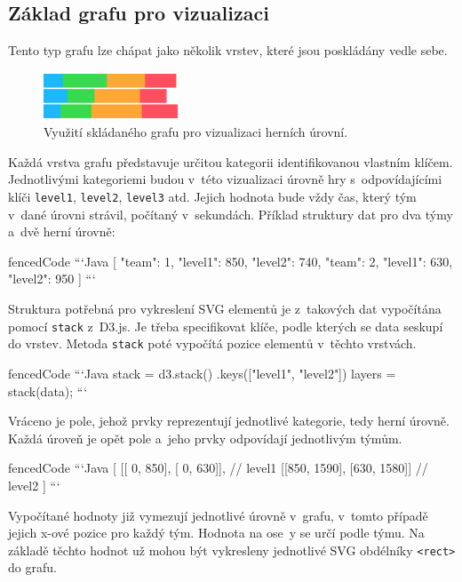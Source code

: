 \documentclass[
  digital, %
  oneside, %
  table,   %
  nolof,     %
  nolot,     %
  nocover
]{fithesis3}
\begin{document}
\subsection{Základ grafu pro vizualizaci} \label{chartBase}
Tento typ grafu lze chápat jako několik vrstev, které jsou poskládány vedle sebe.
\begin{figure}[H]
  \begin{center}
    \includegraphics[width=4cm]{images/stack-ctf.pdf}
  \end{center}
  \caption{Využití skládaného grafu pro vizualizaci herních úrovní.}
  \label{fig:visualizationChart}
\end{figure}
Každá vrstva grafu představuje určitou kategorii identifikovanou vlastním klíčem. Jednotlivými kategoriemi budou v~této vizualizaci úrovně hry s~odpovídajícími klíči \verb|level1|, \verb|level2|, \verb|level3| atd. Jejich hodnota bude vždy čas, který tým v~dané úrovni strávil, počítaný v~sekundách. Příklad struktury dat pro dva týmy a~dvě herní úrovně:
\begin{markdown*}{
  fencedCode
}
```Java
[
  {"team": 1, "level1": 850, "level2": 740},
  {"team": 2, "level1": 630, "level2": 950}
]
```
\end{markdown*}

Struktura potřebná pro vykreslení SVG elementů je z~takových dat vypočítána pomocí \verb|stack| z~D3.js. Je třeba specifikovat klíče, podle kterých se data seskupí do vrstev. Metoda \verb|stack| poté vypočítá pozice elementů v~těchto vrstvách.

\begin{markdown*}{
  fencedCode
}
```Java
stack = d3.stack()
		  .keys(["level1", "level2"])
layers = stack(data);
```
\end{markdown*}
Vráceno je pole, jehož prvky reprezentují jednotlivé kategorie, tedy herní úrovně. Každá úroveň je opět pole a~jeho prvky odpovídají jednotlivým týmům.
\begin{markdown*}{
  fencedCode
}
```Java
[
  [[  0, 850], [  0, 630]],     // level1
  [[850, 1590], [630, 1580]]    // level2
]
```
\end{markdown*}
Vypočítané hodnoty již vymezují jednotlivé úrovně v~grafu, v~tomto případě jejich \mbox{x-ové} pozice pro každý tým. Hodnota na ose~y se určí podle týmu. Na základě těchto hodnot už mohou být vykresleny jednotlivé SVG obdélníky \verb|<rect>| do grafu.
\end{document}
